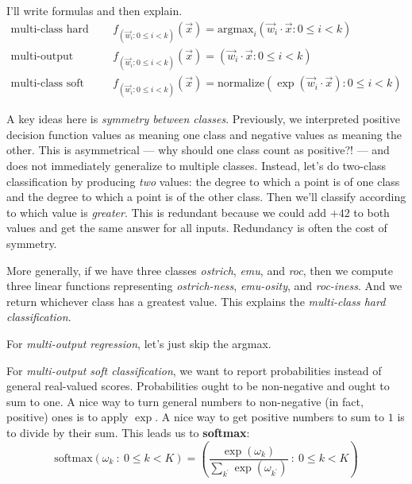         I'll write formulas and then explain.
        \begin{align*}
            \text{multi-class hard classification}\quad&
            f_{(\vec w_i : 0\leq i < k)}(\vec x) = \text{argmax}_i(\vec w_i\cdot \vec x : 0\leq i<k)
        \\
            \text{multi-output regression}\quad&
            f_{(\vec w_i  : 0\leq i < k)}(\vec x) = (\vec w_i \cdot \vec x : 0\leq i < k)
        \\
            \text{multi-class soft classification}\quad&
            f_{(\vec w_i  : 0\leq i < k)}(\vec x) = \text{normalize}(\exp(\vec w_i \cdot \vec x) : 0\leq i < k)
        \end{align*}

        A key ideas here is \emph{symmetry between classes}.  Previously, we
        interpreted positive decision function values as meaning one class and
        negative values as meaning the other.  This is asymmetrical --- why
        should one class count as positive?! --- and does not immediately
        generalize to multiple classes.
        Instead, let's do two-class classification by producing \emph{two}
        values: the degree to which a point is of one class
            and the degree to which a point is of the other class.
        Then we'll classify according to which value is \emph{greater}.
        This is redundant because we could add $+42$ to both values and get the
        same answer for all inputs.  Redundancy is often the cost of symmetry.

        More generally, if we have three classes \emph{ostrich}, \emph{emu},
        and \emph{roc}, then we compute three linear functions representing
        \emph{ostrich-ness}, \emph{emu-osity}, and \emph{roc-iness}.  And we
        return whichever class has a greatest value.  This explains the
        \emph{multi-class hard classification}.

        For \emph{multi-output regression}, let's just skip the argmax.

        For \emph{multi-output soft classification}, we want to report
        probabilities instead of general real-valued scores.  Probabilities
        ought to be non-negative and ought to sum to one.  A nice way to turn
        general numbers to non-negative (in fact, positive) ones is to apply
        $\exp$.  A nice way to get positive numbers to sum to $1$ is to divide
        by their sum.  This leads us to \textbf{softmax}:
        $$
          \text{softmax}(\omega_k ~:~ 0\leq k<K) = \left(\frac{\exp(\omega_k)}{\sum_{k^\prime} \exp(\omega_{k^\prime})} ~:~ 0\leq k<K\right)
        $$





